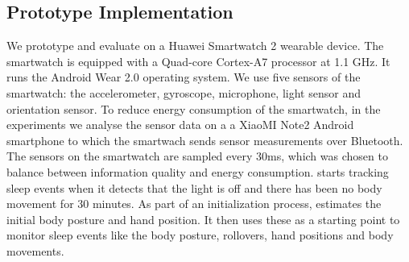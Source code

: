 


\subsection{Prototype Implementation \label{sec:implementation}}
We prototype and evaluate \systemname on a Huawei Smartwatch 2 wearable device. The smartwatch is equipped with a Quad-core Cortex-A7
processor at 1.1 GHz.  It runs the Android Wear 2.0 operating system. We use five sensors of the smartwatch: the accelerometer, gyroscope,
microphone, light sensor and orientation sensor. To reduce energy consumption of the smartwatch, in the experiments we analyse the sensor data on a a XiaoMI Note2 Android smartphone to which the smartwach sends sensor measurements over Bluetooth. The sensors on the smartwatch are sampled every $30$ms, which was chosen to balance between information quality and energy consumption. \systemname starts tracking sleep events when it detects that the light is off and there has been no body movement for 30 minutes. As part of an initialization process, \systemname estimates the initial body posture and hand position. It then uses these as a starting point to monitor sleep events like the body posture, rollovers, hand positions and body movements.
